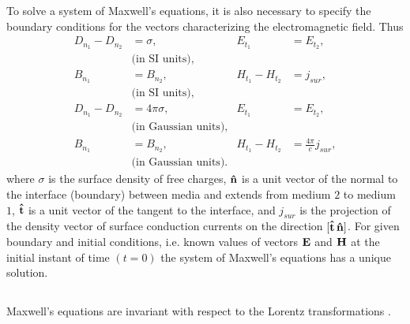 To solve a system of Maxwell's equations, it is also necessary to specify the boundary conditions for the vectors characterizing the electromagnetic field. Thus
\begin{align*}%
D_{n_{1}} - D_{n_{2}}& = \sigma,\,\, & E_{t_{1}} & = E_{t_{2}}, \\ &  \text{(in SI units),} \\
B_{n_{1}} & = B_{n_{2}},\,\, & H_{t_{1}}-H_{t_{2}} & =  j_{sur}, \\ & \text{(in SI units),} \\
D_{n_{1}} - D_{n_{2}} & = 4\pi\sigma,\,\, & E_{t_{1}} & = E_{t_{2}}, \\ & \text{(in Gaussian units),} \\
B_{n_{1}} & = B_{n_{2}},\,\, & H_{t_{1}}-H_{t_{2}} & =  \frac{4\pi}{c}j_{sur}, \\ &  \text{(in Gaussian units).}
\end{align*}
where $\sigma$ is the surface density of free charges, $\vu{n}$ is a unit vector of the normal to the interface (boundary) between media and extends from medium $\mathcal{2}$ to medium $\mathcal{1}$, $\vu{t}$ is a unit vector of the tangent to the interface, and $j_{sur}$ is the projection of the density vector of surface conduction currents on the direction $[\vu{t}\,\vu{n}]$. For given boundary and initial conditions, i.e. known values of vectors $\vb{E}$ and $\vb{H}$ at the initial instant of time $(t=0)$ the system of Maxwell's equations has a unique solution.

\subsection{}\label{27.4.5} Maxwell's equations are invariant with respect to the Lorentz transformations .

